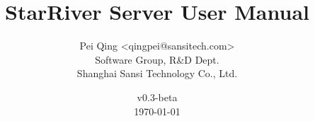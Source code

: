 \title{\textbf{StarRiver Server User Manual}}

\author{Pei Qing <qingpei@sansitech.com> \\
        Software Group, R\&D Dept.\\
        Shanghai Sansi Technology Co., Ltd.
}

\date{\vspace{3em} v0.3-beta \\\vspace{3em} \today}
